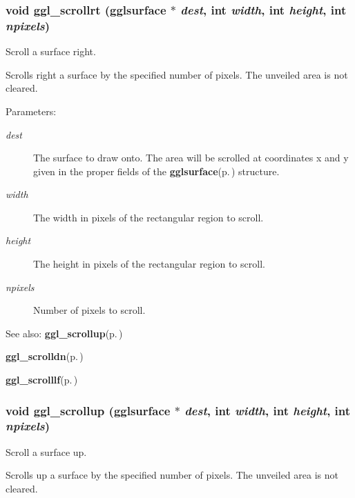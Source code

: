\subsubsection{\setlength{\rightskip}{0pt plus 5cm}void ggl\_\-scrollrt ({\bf gglsurface} $\ast$ {\em dest}, int {\em width}, int {\em height}, int {\em npixels})}\label{ggl_8h_a25}


Scroll a surface right. 

Scrolls right a surface by the specified number of pixels. The unveiled area is not cleared.

\begin{Desc}
\item[Parameters:]
\begin{description}
\item[{\em dest}]The surface to draw onto. The area will be scrolled at coordinates x and y given in the proper fields of the {\bf gglsurface}{\rm (p.\,\pageref{structgglsurface})} structure. \item[{\em width}]The width in pixels of the rectangular region to scroll. \item[{\em height}]The height in pixels of the rectangular region to scroll. \item[{\em npixels}]Number of pixels to scroll.\end{description}
\end{Desc}
\begin{Desc}
\item[See also:]{\bf ggl\_\-scrollup}{\rm (p.\,\pageref{ggl_8h_a22})} 

{\bf ggl\_\-scrolldn}{\rm (p.\,\pageref{ggl_8h_a23})} 

{\bf ggl\_\-scrolllf}{\rm (p.\,\pageref{ggl_8h_a24})} \end{Desc}
\subsubsection{\setlength{\rightskip}{0pt plus 5cm}void ggl\_\-scrollup ({\bf gglsurface} $\ast$ {\em dest}, int {\em width}, int {\em height}, int {\em npixels})}\label{ggl_8h_a22}


Scroll a surface up. 

Scrolls up a surface by the specified number of pixels. The unveiled area is not cleared.

